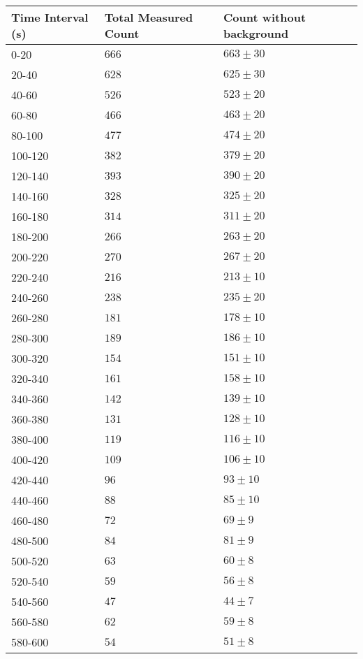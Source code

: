 \begin{tabular}{| p{} | p{} | p{} |}\hline
Time Interval (s) & Total Measured Count & Count without background\\
\hline
0-20 & $666$ & $663\pm 30$\\
20-40 & $628$ & $625\pm 30$\\
40-60 & $526$ & $523\pm 20$\\
60-80 & $466$ & $463\pm 20$\\
80-100 & $477$ & $474\pm 20$\\
100-120 & $382$ & $379\pm 20$\\
120-140 & $393$ & $390\pm 20$\\
140-160 & $328$ & $325\pm 20$\\
160-180 & $314$ & $311\pm 20$\\
180-200 & $266$ & $263\pm 20$\\
200-220 & $270$ & $267\pm 20$\\
220-240 & $216$ & $213\pm 10$\\
240-260 & $238$ & $235\pm 20$\\
260-280 & $181$ & $178\pm 10$\\
280-300 & $189$ & $186\pm 10$\\
300-320 & $154$ & $151\pm 10$\\
320-340 & $161$ & $158\pm 10$\\
340-360 & $142$ & $139\pm 10$\\
360-380 & $131$ & $128\pm 10$\\
380-400 & $119$ & $116\pm 10$\\
400-420 & $109$ & $106\pm 10$\\
420-440 & $96$ & $93\pm 10$\\
440-460 & $88$ & $85\pm 10$\\
460-480 & $72$ & $69\pm 9$\\
480-500 & $84$ & $81\pm 9$\\
500-520 & $63$ & $60\pm 8$\\
520-540 & $59$ & $56\pm 8$\\
540-560 & $47$ & $44\pm 7$\\
560-580 & $62$ & $59\pm 8$\\
580-600 & $54$ & $51\pm 8$\\
\hline
\end{tabular}\quad
